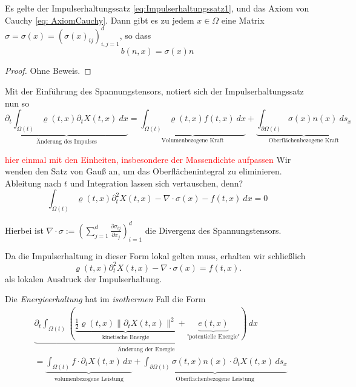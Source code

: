 \begin{theorem}\cite[p.217]{EckGarcke2017}
	Es gelte der Impulserhaltungssatz \eqref{eq:Impulserhaltungssatz1}, und das Axiom von Cauchy \eqref{eq: AxiomCauchy}. Dann gibt es zu jedem $x \in \Omega$ eine Matrix $\sigma = \sigma(x) = (\sigma(x)_{ij})_{i,j =1}^d$, so dass
	\begin{equation*}
		b(n,x) = \sigma(x) n
	\end{equation*}
\end{theorem}
\begin{proof}
	Ohne Beweis.
\end{proof}


Mit der Einführung des Spannungstensors, notiert sich der Impulserhaltungssatz nun so
\begin{equation*}
	\underbrace{\partial_t \int_{\Omega(t)} \varrho(t,x) \partial_t X(t,x) \ dx}_{\text{Änderung des Impulses}} = \underbrace{\int_{\Omega(t)} \varrho(t,x) f(t,x) \ dx}_{\text{Volumenbezogene Kraft}} + \underbrace{\int_{\partial \Omega(t)} \sigma(x) n(x) \ ds_x}_{\text{Oberflächenbezogene Kraft}}
\label{eq:Impulserhaltungssatz2}
\end{equation*}

\textcolor{red}{hier einmal mit den Einheiten, insbesondere der Massendichte aufpassen}
Wir wenden den Satz von Gauß an, um das Oberflächenintegral zu eliminieren. Ableitung nach $t$ und Integration lassen sich vertauschen, denn? 
\begin{equation*}
	\int_{\Omega(t)} \varrho(t,x) \partial_t^2 X(t,x) - \nabla \cdot \sigma(x) - f(t,x) \ dx = 0
\end{equation*}

Hierbei ist $\nabla \cdot \sigma := (\sum_{j=1}^d \frac{\partial \sigma_{ij}}{\partial x_j})_{i=1}^d$ die Divergenz des Spannungstensors.

Da die Impulserhaltung in dieser Form lokal gelten muss, erhalten wir schließlich
\begin{equation}
	\varrho(t,x) \partial_t^2 X(t,x) - \nabla \cdot \sigma(x) = f(t,x). \label{eq:Impulserhaltung3}
\end{equation}
als lokalen Ausdruck der Impulserhaltung. \newline 

Die \textit{Energieerhaltung} hat im \textit{isothermen} Fall die Form
\begin{align}
	& \underbrace{\partial_t \int_{\Omega(t)} \left( \underbrace{\frac{1}{2} \varrho(t,x) \| \partial_t X(t,x)\|^2}_{\text{kinetische Energie}} + \underbrace{e(t,x)}_{\text{"potentielle Energie"}} \right) \, dx}_{\text{Änderung der Energie}} \\
	&= \underbrace{\int_{\Omega(t)} f \cdot \partial_t X(t,x) \, dx}_{\text{volumenbezogene Leistung}} + \underbrace{\int_{\partial\Omega(t)} \sigma(t,x) n(x) \cdot \partial_t X(t,x) \, ds_x}_{\text{Oberflächenbezogene Leistung}}
\end{align}

